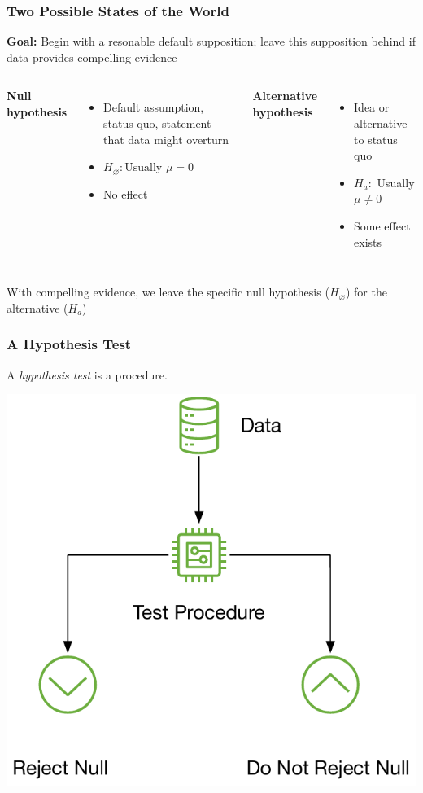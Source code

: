 \documentclass[12pt, block=fill]{beamer}
\begin{document}
\begin{frame}
  \frametitle{Two Possible States of the World}
  \textbf{Goal:} Begin with a resonable default supposition; leave
  this supposition behind if data provides compelling evidence
  \begin{columns}[t]
    \textbf{Null hypothesis}
    \begin{itemize}
    \item Default assumption, status quo, statement that data might overturn
    \item  $H_\varnothing: \text{Usually } \mu=0$
    \item No effect
    \end{itemize}
    \textbf{Alternative hypothesis}
    \begin{itemize}
    \item Idea or alternative to status quo
    \item $H_a:$ Usually  $\mu \neq 0$
    \item Some effect exists
    \end{itemize}
  \end{columns}
  
  With compelling evidence, we leave the specific null hypothesis
  ($H_{\varnothing}$) for the alternative ($H_{a}$)
\end{frame}

\begin{frame}
\frametitle{A Hypothesis Test}

A \textit{hypothesis test} is a procedure.

\begin{center}
  \includegraphics[width=.65\textwidth]{figures/test_procedure}
\end{center}
\end{frame}
\end{document}
